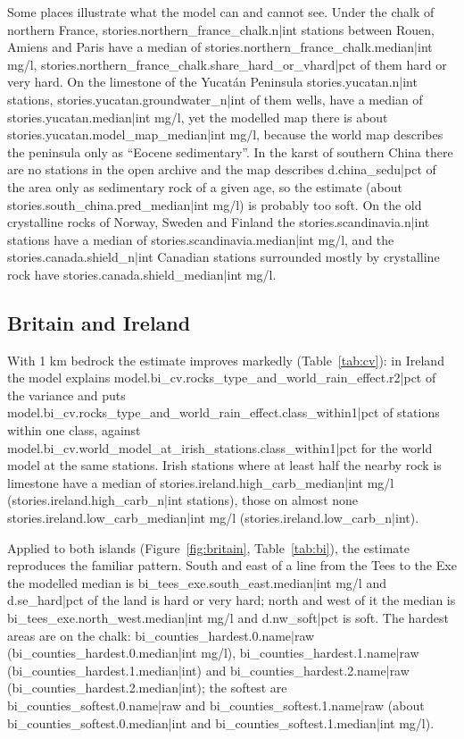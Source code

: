 \documentclass[11pt,a4paper]{article}
\begin{document}
Some places illustrate what the model can and cannot see. Under the chalk of northern France, {{stories.northern_france_chalk.n|int}} stations between Rouen, Amiens and Paris have a median of {{stories.northern_france_chalk.median|int}} mg/l, {{stories.northern_france_chalk.share_hard_or_vhard|pct}} of them hard or very hard. On the limestone of the Yucatán Peninsula {{stories.yucatan.n|int}} stations, {{stories.yucatan.groundwater_n|int}} of them wells, have a median of {{stories.yucatan.median|int}} mg/l, yet the modelled map there is about {{stories.yucatan.model_map_median|int}} mg/l, because the world map describes the peninsula only as ``Eocene sedimentary''. In the karst of southern China there are no stations in the open archive and the map describes {{d.china_sedu|pct}} of the area only as sedimentary rock of a given age, so the estimate (about {{stories.south_china.pred_median|int}} mg/l) is probably too soft. On the old crystalline rocks of Norway, Sweden and Finland the {{stories.scandinavia.n|int}} stations have a median of {{stories.scandinavia.median|int}} mg/l, and the {{stories.canada.shield_n|int}} Canadian stations surrounded mostly by crystalline rock have {{stories.canada.shield_median|int}} mg/l.

\subsection{Britain and Ireland}

With 1 km bedrock the estimate improves markedly (Table~\ref{tab:cv}): in Ireland the model explains {{model.bi_cv.rocks_type_and_world_rain_effect.r2|pct}} of the variance and puts {{model.bi_cv.rocks_type_and_world_rain_effect.class_within1|pct}} of stations within one class, against {{model.bi_cv.world_model_at_irish_stations.class_within1|pct}} for the world model at the same stations. Irish stations where at least half the nearby rock is limestone have a median of {{stories.ireland.high_carb_median|int}} mg/l ({{stories.ireland.high_carb_n|int}} stations), those on almost none {{stories.ireland.low_carb_median|int}} mg/l ({{stories.ireland.low_carb_n|int}}).

Applied to both islands (Figure~\ref{fig:britain}, Table~\ref{tab:bi}), the estimate reproduces the familiar pattern. South and east of a line from the Tees to the Exe the modelled median is {{bi_tees_exe.south_east.median|int}} mg/l and {{d.se_hard|pct}} of the land is hard or very hard; north and west of it the median is {{bi_tees_exe.north_west.median|int}} mg/l and {{d.nw_soft|pct}} is soft. The hardest areas are on the chalk: {{bi_counties_hardest.0.name|raw}} ({{bi_counties_hardest.0.median|int}} mg/l), {{bi_counties_hardest.1.name|raw}} ({{bi_counties_hardest.1.median|int}}) and {{bi_counties_hardest.2.name|raw}} ({{bi_counties_hardest.2.median|int}}); the softest are {{bi_counties_softest.0.name|raw}} and {{bi_counties_softest.1.name|raw}} (about {{bi_counties_softest.0.median|int}} and {{bi_counties_softest.1.median|int}} mg/l).
\end{document}
